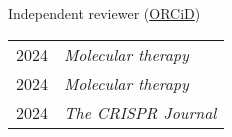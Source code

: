 






% 

\small

Independent reviewer (\href{https://orcid.org/0000-0002-4934-4731}{ORCiD})


\begin{longtable}[l]{@{}p{} p{}}
    2024 & \textit{Molecular therapy} \\
    2024 & \textit{Molecular therapy} \\
    2024 & \textit{The CRISPR Journal} \\
\end{longtable}

